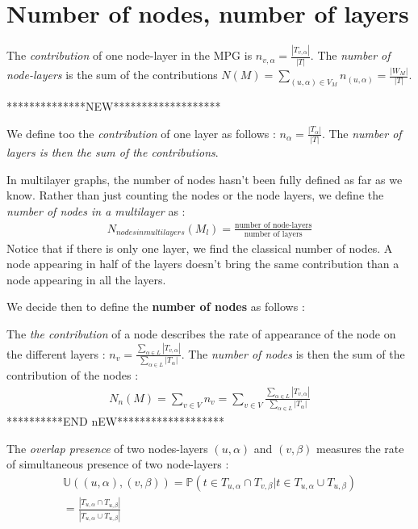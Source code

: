 \documentclass[dvipsnames,a4paper,11pt]{article}
\theoremstyle{definition}
\theoremstyle{remark}
\theoremstyle{remark}
\begin{document}
	\section{Number of nodes, number of layers}
	
	
	 The {\em contribution} of one node-layer in the MPG is $n_{v,\alpha} = \frac{|T_{v,\alpha}|}{|T|}$. The {\em number of node-layers} is the sum of the contributions $N(M) = \underset{(u,\alpha)\in V_M}{\sum} n_{(u,\alpha)} = \frac{|W_M|}{|T|}$.
    
**************NEW*******************    
    
    We define too the {\em contribution} of one layer as follows : $n_\alpha = \frac{|T_{\alpha}|}{|T|}$. The {\em number of layers is then the sum of the contributions}.
    
	In multilayer graphs, the number of nodes hasn't been fully defined as far as we know.
	Rather than just counting the nodes or the node layers, we define the {\em number of nodes in a multilayer} as :
	\begin{align*}
		N_{nodes in multilayers}(M_l) = \frac{\text{number of node-layers}}{\text{number of layers}}
	\end{align*}	    
	Notice that if there is only one layer, we find the classical number of nodes. A node appearing in half of the layers doesn't bring the same contribution than a node appearing in all the layers.  
    
    We decide then to define the \textbf{number of nodes} as follows : 
    
    The {\em the contribution} of a node describes the rate of appearance of the node on the different layers : $n_v = \frac{\sum_{\alpha \in L}|T_{v,\alpha}|}{\sum_{\alpha \in L} |T_{\alpha}|}$.
    The {\em number of nodes} is then the sum of the contribution of the nodes : 
    \begin{align}
    N_n(M) = \sum_{v\in V} n_v= \sum_{v\in V} \frac{\sum_{\alpha \in L}|T_{v,\alpha}|}{\sum_{\alpha \in L} |T_{\alpha}|} 
    \label{numberNodes}
	\end{align}     
**********END nEW*******************

	The {\em overlap presence } of two nodes-layers $(u,\alpha)$ and $(v,\beta)$ measures the rate of simultaneous presence of two node-layers :
	\begin{align*}
		\mathbb{U}((u,\alpha),(v,\beta))=\mathbb{P}( t \in T_{u,\alpha} \cap T_{v,\beta} | t \in T_{u,\alpha} \cup T_{u,\beta}) \\
		= \frac{|T_{u,\alpha}\cap T_{u,\beta}|}{|T_{u,\alpha}\cup T_{u,\beta}|}
	\end{align*}
\end{document}
